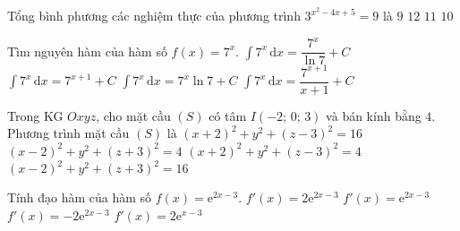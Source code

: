 \begin{ex}%
Tổng bình phương các nghiệm thực của phương trình ${{3}^{x^2-4x+5}}=9$ là 
\choice 
{ $9$}
{ $12$}
{ $11$}
{ \True $10$}
\end{ex} 

\begin{ex}%
Tìm nguyên hàm của hàm số $f( x )=7^{x}$.
\choice 
{ \True $\displaystyle\int 7^{x}\mathrm{\,d}x=\dfrac{7^x}{\ln 7}+C$}
{ $\displaystyle\int 7^x\mathrm{\,d}x=7^{x+1}+C$}
{ $\displaystyle\int 7^{x}\mathrm{\,d}x=7^{x}\ln 7+C$}
{ $\displaystyle\int 7^{x}\mathrm{\,d}x=\dfrac{7^{x+1}}{x+1}+C$}
\end{ex} 

\begin{ex}%
Trong KG $Oxyz$, cho mặt cầu $( S )$ có tâm $I( -2;\,0;\,3 )$ và bán kính bằng $4$. Phương trình mặt cầu $( S )$ là
\choice 
{ \True ${{( x+2 )}^2}+{{y}^2}+{{( z-3 )}^2}=16$}
{ ${{( x-2 )}^2}+{{y}^2}+{{( z+3 )}^2}=4$} 
{ ${{( x+2 )}^2}+{{y}^2}+{{( z-3 )}^2}=4$}
{ ${{( x-2 )}^2}+{{y}^2}+{{( z+3 )}^2}=16$}
\end{ex} 

\begin{ex}%
Tính đạo hàm của hàm số $f( x )={\mathrm{e}^{2x-3}}$.
\choice 
{ \True $f'( x )=2{\mathrm{e}^{2x-3}}$}
{ $f'( x )={\mathrm{e}^{2x-3}}$}
{ $f'( x )=-2{\mathrm{e}^{2x-3}}$}
{ $f'( x )=2{\mathrm{e}^{x-3}}$}
\end{ex} 

